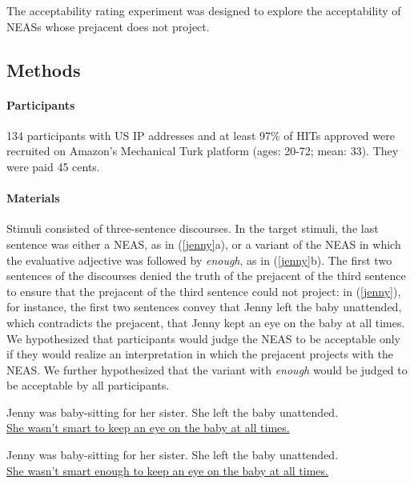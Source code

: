 \documentclass[11pt,fleqn]{article}
\newcommand{\6}{\mbox{$[\hspace*{-.6mm}[$}}
\newcommand{\9}{\mbox{$]\hspace*{-.6mm}]$}}
\begin{document}
The acceptability rating experiment was designed to explore the acceptability of  NEASs whose prejacent does not project. 

\subsection{Methods}

\paragraph{Participants} 134 participants with US IP addresses and at least 97\% of HITs approved were recruited on Amazon's Mechanical Turk platform (ages: 20-72; mean: 33). They were paid 45 cents.

\paragraph{Materials} Stimuli consisted of three-sentence discourses. In the target stimuli, the last sentence was either a NEAS, as in (\ref{jenny}a), or a variant of the NEAS in which the evaluative adjective was followed by {\em enough}, as in (\ref{jenny}b). The first two sentences of the discourses denied the truth of the prejacent of the third sentence to ensure that the prejacent of the third sentence could not project: in (\ref{jenny}), for instance, the first two sentences convey that Jenny left the baby unattended, which contradicts the prejacent, that Jenny kept an eye on the baby at all times. We hypothesized that participants would judge the NEAS to be acceptable only if they would realize an interpretation in which the prejacent projects with the NEAS. We further hypothesized that the variant with {\em enough} would be judged to be acceptable by all participants.

\begin{exe} 
\ex\label{jenny} 
\begin{xlist}
\ex Jenny was baby-sitting for her sister. She
left the baby unattended. \\ \underline{She wasn't smart to keep an eye on the baby at all times.} 

\ex Jenny was baby-sitting for her sister. She
left the baby unattended. \\ \underline{She wasn't smart enough to keep an eye on the baby at all times.} 

\end{xlist}
\end{exe} 
\end{document}
